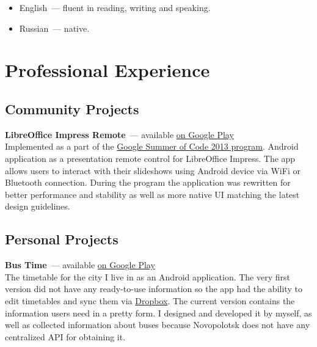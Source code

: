     \begin{itemize}

      \item English~--- fluent in reading, writing and speaking.

      \item Russian~--- native.

    \end{itemize}


  \section*{Professional Experience}

    \subsection*{Community Projects}

      \textbf{LibreOffice Impress Remote}~--- available \href{https://play.google.com/store/apps/details?id=org.libreoffice.impressremote}{on Google Play} \\

        Implemented as a part of the \href{https://developers.google.com/open-source/soc}{Google Summer of Code 2013 program}.
        Android application as a presentation remote control for LibreOffice Impress.
        The app allows users to interact with their slideshows using Android device
        via WiFi or Bluetooth connection. During the program the application was
        rewritten for better performance and stability as well as more native
        UI matching the latest design guidelines. \\

    \subsection*{Personal Projects}

      \textbf{Bus Time}~--- available \href{https://play.google.com/store/apps/details?id=ru.ming13.bustime}{on Google Play} \\

        The timetable for the city I live in as an Android application.
        The very first version did not have any ready-to-use information so the app
        had the ability to edit timetables and sync them via
        \href{https://dropbox.com}{Dropbox}. The current version contains
        the information users need in a pretty form. I designed and developed
        it by myself, as well as collected information about buses because Novopolotsk
        does not have any centralized API for obtaining it. \\

